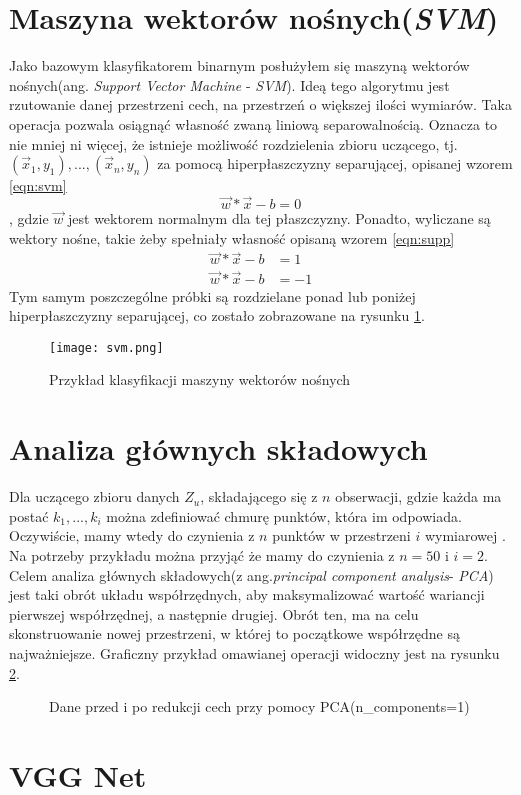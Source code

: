 \section{Maszyna wektorów nośnych(\textit{SVM})}

Jako bazowym klasyfikatorem binarnym posłużyłem się maszyną wektorów nośnych(ang. \textit{Support Vector Machine} - \textit{SVM}). Ideą tego algorytmu jest rzutowanie danej przestrzeni cech, na przestrzeń o większej ilości wymiarów. Taka operacja pozwala osiągnąć własność zwaną liniową separowalnością. Oznacza to nie mniej ni więcej, że istnieje możliwość rozdzielenia zbioru uczącego, tj. ${(\vec{x}_{1},y_{1}),...,(\vec{x}_{n},y_{n})}$ za pomocą hiperpłaszczyzny separującej, opisanej wzorem \ref{eqn:svm}
\begin{equation}
	\vec{w} * \vec{x}-b=0
	\label{eqn:svm}
\end{equation}
, gdzie $\vec{w}$ jest wektorem normalnym dla tej płaszczyzny. Ponadto, wyliczane są wektory nośne, takie żeby spełniały własność opisaną wzorem \ref{eqn:supp}
\begin{equation}
	\begin{split}
		\vec{w} * \vec{x}-b &=1 \\
		\vec{w} * \vec{x}-b &=-1
	\end{split}
	\label{eqn:supp}
\end{equation}
Tym samym poszczególne próbki są rozdzielane ponad lub poniżej hiperpłaszczyzny separującej, co zostało zobrazowane na rysunku \ref{fig:svm}.
\begin{figure}[h!]
	\texttt{[image: svm.png]}
	\centering
	\caption{Przykład klasyfikacji maszyny wektorów nośnych}
	\label{fig:svm}
\end{figure}

\section{Analiza głównych składowych}

Dla uczącego zbioru danych $Z_{u}$, składającego się z $n$ obserwacji, gdzie każda ma postać ${k_{1}, ..., k_{i}}$ można zdefiniować chmurę punktów, która im odpowiada. Oczywiście, mamy wtedy do czynienia z $n$ punktów w przestrzeni $i$ wymiarowej \cite{pca}. Na potrzeby przykładu można przyjąć że mamy do czynienia z $n=50$ i $i=2$. Celem analiza głównych składowych(z ang.\textit{principal component analysis}- \textit{PCA}) jest taki obrót układu współrzędnych, aby maksymalizować wartość wariancji pierwszej współrzędnej, a następnie drugiej. Obrót ten, ma na celu skonstruowanie nowej przestrzeni, w której to początkowe współrzędne są najważniejsze. Graficzny przykład omawianej operacji widoczny jest na rysunku \ref{fig:pca}.

\begin{figure}[h!]
	\centering
	\qquad
	\caption{Dane przed i po redukcji cech przy pomocy PCA(n\_components=1)}
	\label{fig:pca}
\end{figure}

\section{VGG Net}